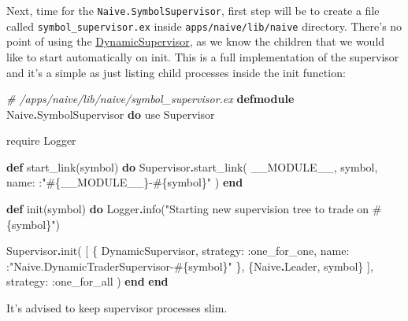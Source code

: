 \documentclass[
  oneside]{book}
\newenvironment{Shaded}{\begin{snugshade}}{\end{snugshade}}
\newcommand{\CommentTok}[1]{\textcolor[rgb]{0.56,0.35,0.01}{\textit{#1}}}
\newcommand{\ConstantTok}[1]{\textcolor[rgb]{0.00,0.00,0.00}{#1}}
\newcommand{\ImportTok}[1]{#1}
\newcommand{\KeywordTok}[1]{\textcolor[rgb]{0.13,0.29,0.53}{\textbf{#1}}}
\newcommand{\NormalTok}[1]{#1}
\newcommand{\OperatorTok}[1]{\textcolor[rgb]{0.81,0.36,0.00}{\textbf{#1}}}
\newcommand{\OtherTok}[1]{\textcolor[rgb]{0.56,0.35,0.01}{#1}}
\newcommand{\StringTok}[1]{\textcolor[rgb]{0.31,0.60,0.02}{#1}}
\newcommand{\VariableTok}[1]{\textcolor[rgb]{0.00,0.00,0.00}{#1}}
\begin{document}
Next, time for the \texttt{Naive.SymbolSupervisor}, first step will be to create a file called \texttt{symbol\_supervisor.ex} inside \texttt{apps/naive/lib/naive} directory. There's no point of using the \href{https://hexdocs.pm/elixir/master/DynamicSupervisor.html}{DynamicSupervisor}, as we know the children that we would like to start automatically on init. This is a full implementation of the supervisor and it's a simple as just listing child processes inside the init function:

\begin{Shaded}
\begin{Highlighting}[]
\CommentTok{\# /apps/naive/lib/naive/symbol\_supervisor.ex}
\KeywordTok{defmodule} \ConstantTok{Naive}\OperatorTok{.}\ConstantTok{SymbolSupervisor} \KeywordTok{do}
  \ImportTok{use} \ConstantTok{Supervisor}

  \ImportTok{require} \ConstantTok{Logger}

  \KeywordTok{def}\NormalTok{ start\_link(symbol) }\KeywordTok{do}
    \ConstantTok{Supervisor}\OperatorTok{.}\NormalTok{start\_link(}
      \ConstantTok{\_\_MODULE\_\_}\NormalTok{,}
\NormalTok{      symbol,}
      \VariableTok{name:}\NormalTok{ :}\StringTok{"}\OtherTok{\#\{}\ConstantTok{\_\_MODULE\_\_}\OtherTok{\}}\StringTok{{-}}\OtherTok{\#\{}\NormalTok{symbol}\OtherTok{\}}\StringTok{"}
\NormalTok{    )}
  \KeywordTok{end}

  \KeywordTok{def}\NormalTok{ init(symbol) }\KeywordTok{do}
    \ConstantTok{Logger}\OperatorTok{.}\NormalTok{info(}\StringTok{"Starting new supervision tree to trade on }\OtherTok{\#\{}\NormalTok{symbol}\OtherTok{\}}\StringTok{"}\NormalTok{)}

    \ConstantTok{Supervisor}\OperatorTok{.}\NormalTok{init(}
\NormalTok{      [}
\NormalTok{        \{}
          \ConstantTok{DynamicSupervisor}\NormalTok{,}
          \VariableTok{strategy:} \VariableTok{:one\_for\_one}\NormalTok{,}
          \VariableTok{name:}\NormalTok{ :}\StringTok{"Naive.DynamicTraderSupervisor{-}}\OtherTok{\#\{}\NormalTok{symbol}\OtherTok{\}}\StringTok{"}
\NormalTok{        \},}
\NormalTok{        \{}\ConstantTok{Naive}\OperatorTok{.}\ConstantTok{Leader}\NormalTok{, symbol\}}
\NormalTok{      ],}
      \VariableTok{strategy:} \VariableTok{:one\_for\_all}
\NormalTok{    )}
  \KeywordTok{end}
\KeywordTok{end}
\end{Highlighting}
\end{Shaded}

It's advised to keep supervisor processes slim.
\end{document}
